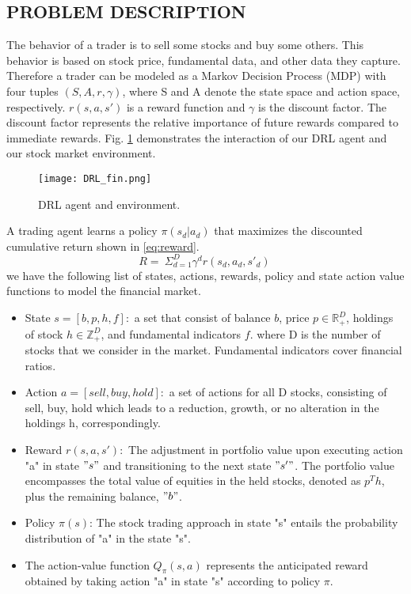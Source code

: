 {\subsection{PROBLEM DESCRIPTION}

The behavior of a trader is to sell some stocks and buy some others. This behavior is based on stock price, fundamental data,
and other data they capture. Therefore a trader can be modeled as a Markov Decision Process (MDP) with four tuples $(S, A, r, \gamma)$, where S and A denote the state space and action space, respectively. $r(s, a, s' )$ is a reward function and $\gamma$ is the discount factor. The discount factor represents the relative importance of future rewards compared to immediate rewards. Fig. \ref{fig:drl} demonstrates the interaction of our DRL agent and our stock market environment.  

\begin{figure}[htbp]
\centerline{
\texttt{[image: DRL\_fin.png]}}
\caption{DRL agent and environment.}
\label{fig:drl}
\end{figure}


A trading agent learns a policy $\pi(s_d|a_d) $ that maximizes the discounted cumulative return shown in \eqref{eq:reward}.
\begin{equation}
     R=\ \Sigma_{d=1}^{D} \gamma^d r(s_d,a_d, s'_d) \
     \label{eq:reward}
\end{equation}
we have the following list of states, actions, rewards, policy and state action value functions to model the financial market.
\begin{itemize}
    \item State $s=[b, p, h, f]:$ a set that consist of balance $b$, price $p \in \mathbb{R}_+^D$, holdings of stock $h\in \mathbb{Z}_+^D$, and fundamental indicators $f$. where D is the number of stocks that we consider in the market. Fundamental indicators cover financial ratios.
    \item Action $a=[sell, buy, hold]:$ a set of actions for all D stocks, consisting of sell, buy, hold which leads to a reduction, growth, or no alteration in the holdings h, correspondingly.
    \item Reward $r(s, a, s'):$ The adjustment in portfolio value upon executing action "a" in state $"s"$ and transitioning to the next state $"s'"$. The portfolio value encompasses the total value of equities in the held stocks, denoted as $p^Th$, plus the remaining balance, $"b"$.
    \item Policy $\pi(s)$: The stock trading approach in state "s" entails the probability distribution of "a" in the state "s".
    \item The action-value function $Q_\pi(s, a)$
    represents the anticipated reward obtained by taking action "a" in state "s" according to policy $\pi$.
\end{itemize}



}
